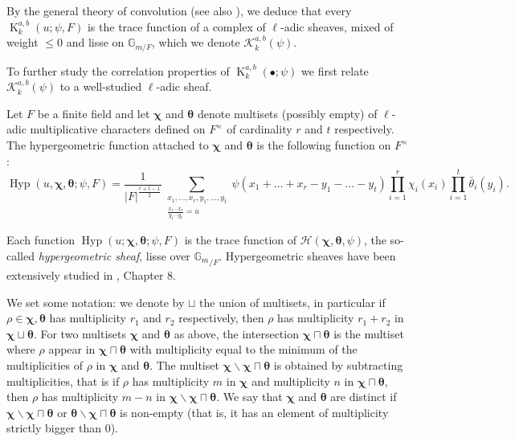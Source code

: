 \documentclass[12pt]{amsart}
\theoremstyle{plain}
\theoremstyle{definition}
\theoremstyle{remark}
\numberwithin{equation}{section}
\renewcommand{\leq}{\leqslant}
\DeclareMathOperator{\K}{K} %
\DeclareMathOperator{\Hyp}{Hyp} %
\begin{document}
By the general theory of convolution \cite{Katz2012Convolution} (see also \cite{Katzbook}), we deduce that every $\K_k^{a,b}(u;\psi,F)$ is the trace function of a complex of $\ell$-adic sheaves, mixed of weight $\leq 0$ and lisse on $\mathbb{G}_{m/F}$, which we denote $\mathcal{K}_k^{a,b}(\psi)$. 





 To further study the correlation properties of $\K_k^{a,b}(\bullet;\psi)$ we first relate $\mathcal{K}^{a,b}_k(\psi)$ to a well-studied $\ell$-adic sheaf.





Let $F$ be a finite field and let $\bm{\chi}$ and $\bm{\theta}$ denote multisets (possibly empty) of $\ell$-adic multiplicative characters defined on $F^{\times}$ of cardinality $r$ and $t$ respectively. The hypergeometric function attached to $\bm{\chi}$ and $\bm{\theta}$ is the following function on $F^{\times}$:
\begin{equation*}
    \Hyp(u,\bm \chi,\bm \theta;\psi,F)=\frac{1}{|F|^{\frac{r+t-1}2}}\sum_{\substack{x_1,\ldots,x_r,y_1,\ldots,y_t\\\frac{x_1\cdots x_r}{y_1\cdots y_t}=u}}\psi(x_1+\ldots+x_r-y_1-\ldots-y_t)\prod_{i=1}^r\chi_i(x_i)\prod_{i=1}^t\bar\theta_i(y_i).
\end{equation*}

Each function $\operatorname{Hyp}(u;\bm{\chi},\bm{\theta};\psi,F)$ is the trace function of $\mathcal{H}(\bm{\chi},\bm{\theta},\psi)$, the so-called \emph{hypergeometric sheaf}, lisse over ${\mathbb{G}_m}_{/F}$. Hypergeometric sheaves have been extensively studied in \cite{Katzbook}, Chapter 8. 

We set some notation: we denote by $\sqcup$ the union of multisets, in particular if $\rho \in \bm{\chi},\bm{\theta}$ has multiplicity $r_1$ and $r_2$ respectively, then $\rho$ has multiplicity $r_1+r_2$ in $\bm{\chi}\sqcup \bm{\theta}.$ For two multisets $\bm{\chi}$ and $\bm{\theta}$ as above, the intersection $\bm{\chi}\sqcap \bm{\theta}$ is the multiset where $\rho$ appear in $\bm{\chi}\sqcap \bm{\theta}$ with multiplicity equal to the minimum of the multiplicities of $\rho$ in $\bm{\chi}$ and $\bm{\theta}$. The multiset $\bm{\chi}\smallsetminus\bm{\chi}\sqcap\bm{\theta}$ is obtained by subtracting multiplicities, that is if $\rho$ has multiplicity $m$ in $\bm{\chi}$ and multiplicity $n$ in $\bm{\chi}\sqcap \bm{\theta}$, then $\rho$ has multiplicity $m-n$ in $\bm{\chi}\smallsetminus\bm{\chi}\sqcap\bm{\theta}$. We say that $\bm{\chi}$ and $\bm{\theta}$ are distinct if $\bm{\chi}\smallsetminus\bm{\chi}\sqcap\bm{\theta}$ or $\bm{\theta}\smallsetminus\bm{\chi}\sqcap\bm{\theta}$ is non-empty (that is, it has an element of multiplicity strictly bigger than $0$). 
\end{document}
